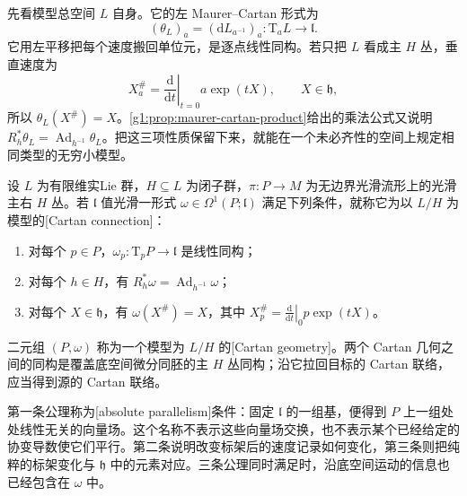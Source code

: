 \ProseParagraphBreak

先看模型总空间 \(L\) 自身。它的左 Maurer--Cartan 形式为
\[
	(\theta_L)_a=(\mathrm{d}L_{a^{-1}})_a:
	\mathrm{T}_aL\longrightarrow\mathfrak l.
\]
它用左平移把每个速度搬回单位元，是逐点线性同构。若只把 \(L\) 看成主 \(H\) 丛，垂直速度为
\[
	X_a^\#=\left.\frac{\mathrm{d}}{\mathrm{d}t}\right|_{t=0}
	a\exp(tX),\qquad X\in\mathfrak h,
\]
所以 \(\theta_L(X^\#)=X\)。\cref{g1:prop:maurer-cartan-product}给出的乘法公式又说明 \(R_h^*\theta_L=\operatorname{Ad}_{h^{-1}}\theta_L\)。把这三项性质保留下来，就能在一个未必齐性的空间上规定相同类型的无穷小模型。

\begin{definition}[Cartan 联络]\label{g1:def:cartan-connection}
	设 \(L\) 为有限维实Lie 群，\(H\subseteq L\) 为闭子群，\(\pi:P\to M\) 为无边界光滑流形上的光滑主右 \(H\) 丛。若 \(\mathfrak l\) 值光滑一形式 \(\omega\in\Omega^1(P;\mathfrak l)\) 满足下列条件，就称它为以 \(L/H\) 为模型的[Cartan connection]：
	\begin{enumerate}
		\item 对每个 \(p\in P\)，\(\omega_p:\mathrm{T}_pP\to\mathfrak l\) 是线性同构；
		\item 对每个 \(h\in H\)，有 \(R_h^*\omega=\operatorname{Ad}_{h^{-1}}\omega\)；
		\item 对每个 \(X\in\mathfrak h\)，有 \(\omega(X^\#)=X\)，其中 \(X^\#_p=\left.\frac{\mathrm{d}}{\mathrm{d}t}\right|_0p\exp(tX)\)。
	\end{enumerate}
	二元组 \((P,\omega)\) 称为一个模型为 \(L/H\) 的[Cartan geometry]。两个 Cartan 几何之间的同构是覆盖底空间微分同胚的主 \(H\) 丛同构；沿它拉回目标的 Cartan 联络，应当得到源的 Cartan 联络。
\end{definition}

第一条公理称为[absolute parallelism]条件：固定 \(\mathfrak l\) 的一组基，便得到 \(P\) 上一组处处线性无关的向量场。这个名称不表示这些向量场交换，也不表示某个已经给定的协变导数使它们平行。第二条说明改变标架后的速度记录如何变化，第三条则把纯粹的标架变化与 \(\mathfrak h\) 中的元素对应。三条公理同时满足时，沿底空间运动的信息也已经包含在 \(\omega\) 中。

